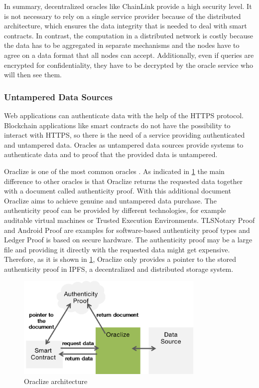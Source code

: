 \documentclass[conference]{IEEEtran}
\begin{document}
In summary, decentralized oracles like ChainLink provide a high security level. It is not necessary to rely on a single service provider because of the distributed architecture, which ensures the data integrity that is needed to deal with smart contracts. In contrast, the computation in a distributed network is costly because the data has to be aggregated in separate mechanisms and the nodes have to agree on a data format that all nodes can accept. Additionally, even if queries are encrypted for confidentiality, they have to be decrypted by the oracle service who will then see them. \cite{Ellis2017} \cite{Oraclize2017}
\subsubsection{Untampered Data Sources}
Web applications can authenticate data with the help of the HTTPS protocol. Blockchain applications like smart contracts do not have the possibility to interact with HTTPS, so there is the need of a service providing authenticated and untampered data. Oracles as untampered data sources provide systems to authenticate data and to proof that the provided data is untampered. \cite{Oraclize2017} \par 
Oraclize is one of the most common oracles \cite{Bartoletti2017}. As indicated in \ref{oraclize} the main difference to other oracles is that Oraclize returns the requested data together with a document called authenticity proof. With this additional document Oraclize aims to achieve genuine and untampered data purchase. The authenticity proof can be provided by different technologies, for example auditable virtual machines or Trusted Execution Environments. TLSNotary Proof and Android Proof are examples for software-based authenticity proof types and Ledger Proof is based on secure hardware. The authenticity proof may be a large file and providing it directly with the requested data might get expensive. Therefore, as it is shown in \ref{oraclize}, Oraclize only provides a pointer to the stored authenticity proof in IPFS, a decentralized and distributed storage system. \cite{Oraclize2017} \par
\begin{figure}[h]
	\begin{center}
		\includegraphics[width=9cm]{Oraclize.png}
		\caption{Oraclize architecture}
		\label{oraclize}
	\end{center}
\end{figure}
\end{document}
